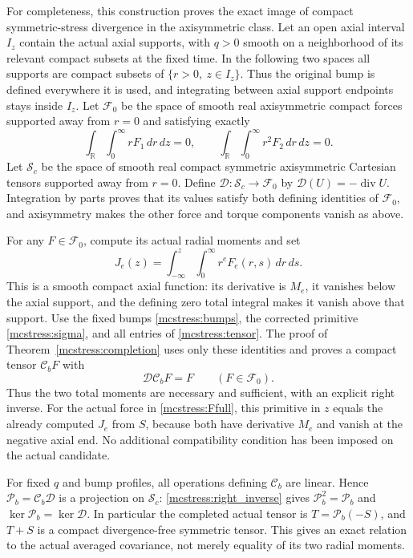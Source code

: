 \documentclass[11pt]{article}
\begin{document}
For completeness, this construction proves the exact image of compact
symmetric-stress divergence in the axisymmetric class. Let
an open axial interval $I_z$ contain the actual axial supports, with
$q>0$ smooth on a neighborhood of its relevant compact subsets at the
fixed time. In the following two spaces all supports are compact
subsets of $\{r>0,\ z\in I_z\}$. Thus the original bump is defined
everywhere it is used, and integrating between axial support endpoints
stays inside $I_z$.
Let
$\mathcal F_0$ be the space of smooth real axisymmetric compact forces
supported away from $r=0$ and satisfying exactly
\[
 \int_{\mathbb R}\int_0^\infty rF_1\,dr\,dz=0,
 \qquad
 \int_{\mathbb R}\int_0^\infty r^2F_2\,dr\,dz=0.
\]
Let $\mathcal S_c$ be the space of smooth real compact symmetric
axisymmetric Cartesian tensors supported away from $r=0$. Define
$\mathcal D:\mathcal S_c\to\mathcal F_0$ by
$\mathcal D(U)=-\operatorname{div}U$.
Integration by parts proves that its values satisfy both defining
identities of $\mathcal F_0$, and axisymmetry makes the other force
and torque components vanish as above.

For any $F\in\mathcal F_0$, compute its actual radial moments and set
\[
 J_e(z)=\int_{-\infty}^z\int_0^\infty r^eF_e(r,s)\,dr\,ds.
\]
This is a smooth compact axial function: its derivative is $M_e$, it
vanishes below the axial support, and the defining zero total integral
makes it vanish above that support. Use the fixed bumps
\eqref{mcstress:bumps}, the corrected primitive
\eqref{mcstress:sigma}, and all entries of
\eqref{mcstress:tensor}. The proof of Theorem~\ref{mcstress:completion}
uses only these identities and proves a compact tensor
$\mathcal C_bF$ with
\begin{equation}\label{mcstress:right_inverse}
 \mathcal D\mathcal C_bF=F\qquad(F\in\mathcal F_0).
\end{equation}
Thus the two total moments are necessary and sufficient, with an
explicit right inverse. For the actual force in
\eqref{mcstress:Ffull}, this primitive in $z$ equals the already
computed $J_e$ from $S$, because both have derivative $M_e$ and vanish
at the negative axial end. No additional compatibility condition has
been imposed on the actual candidate.

For fixed $q$ and bump profiles, all operations defining
$\mathcal C_b$ are linear. Hence
$\mathcal P_b=\mathcal C_b\mathcal D$ is a projection on
$\mathcal S_c$: \eqref{mcstress:right_inverse} gives
$\mathcal P_b^2=\mathcal P_b$ and
$\ker\mathcal P_b=\ker\mathcal D$.
In particular the completed actual tensor is
$T=\mathcal P_b(-S)$, and $T+S$ is a compact divergence-free symmetric
tensor. This gives an exact relation to the actual averaged covariance,
not merely equality of its two radial moments.
\end{document}
